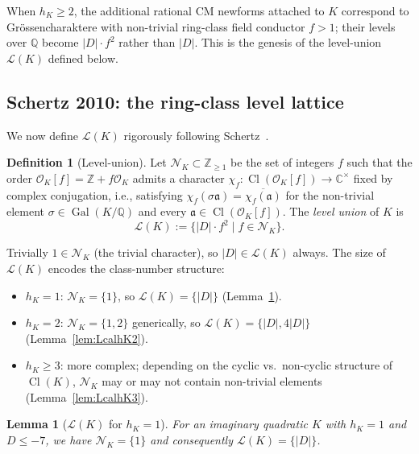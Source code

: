 \documentclass[11pt,a4paper]{amsart}
\newtheorem{lemma}[theorem]{Lemma}
\theoremstyle{definition}
\newtheorem{definition}[theorem]{Definition}
\DeclareMathOperator{\Gal}{Gal}
\DeclareMathOperator{\Cl}{Cl}
\newcommand{\Q}{\mathbb{Q}}
\newcommand{\Z}{\mathbb{Z}}
\newcommand{\C}{\mathbb{C}}
\newcommand{\OK}{\mathcal{O}_K}
\newcommand{\fa}{\mathfrak{a}}
\newcommand{\Lcal}{\mathcal{L}}
\newcommand{\Ncal}{\mathcal{N}}
\newcommand{\hK}{h_{K}}
\begin{document}
When $\hK \ge 2$, the additional rational CM newforms attached to $K$ correspond to Gr\"ossencharaktere with non-trivial ring-class field conductor $f > 1$; their levels over $\Q$ become $|D| \cdot f^2$ rather than $|D|$. This is the genesis of the level-union $\Lcal(K)$ defined below.

\subsection{Schertz 2010: the ring-class level lattice}\label{sec:schertz-Lcal}

We now define $\Lcal(K)$ rigorously following Schertz~\cite[\S6.3]{Schertz2010}.

\begin{definition}[Level-union]\label{def:Lcal}
Let $\Ncal_K \subset \Z_{\ge 1}$ be the set of integers $f$ such that the order $\OK[f] = \Z + f\OK$ admits a character $\chi_f \colon \Cl(\OK[f]) \to \C^\times$ fixed by complex conjugation, i.e., satisfying $\chi_f(\sigma \fa) = \overline{\chi_f(\fa)}$ for the non-trivial element $\sigma \in \Gal(K/\Q)$ and every $\fa \in \Cl(\OK[f])$. The \emph{level union} of $K$ is
\[
\Lcal(K) := \{|D| \cdot f^2 \mid f \in \Ncal_K\}.
\]
\end{definition}

Trivially $1 \in \Ncal_K$ (the trivial character), so $|D| \in \Lcal(K)$ always. The size of $\Lcal(K)$ encodes the class-number structure:
\begin{itemize}[leftmargin=2em]
  \item $\hK = 1$: $\Ncal_K = \{1\}$, so $\Lcal(K) = \{|D|\}$ (Lemma~\ref{lem:LcalhK1}).
  \item $\hK = 2$: $\Ncal_K = \{1, 2\}$ generically, so $\Lcal(K) = \{|D|, 4|D|\}$ (Lemma~\ref{lem:LcalhK2}).
  \item $\hK \ge 3$: more complex; depending on the cyclic vs.\ non-cyclic structure of $\Cl(K)$, $\Ncal_K$ may or may not contain non-trivial elements (Lemma~\ref{lem:LcalhK3}).
\end{itemize}

\begin{lemma}[$\Lcal(K)$ for $\hK = 1$]\label{lem:LcalhK1}
For an imaginary quadratic $K$ with $\hK = 1$ and $D \le -7$, we have $\Ncal_K = \{1\}$ and consequently $\Lcal(K) = \{|D|\}$.
\end{lemma}
\end{document}
